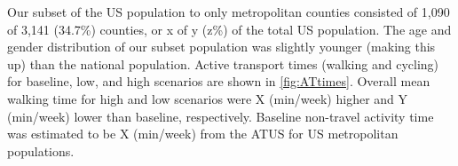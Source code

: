 Our subset of the US population to only metropolitan counties consisted of 1,090 of 3,141 (34.7\%) counties, or x of y (z\%) of the total US population. The age and gender distribution of our subset population was slightly younger (making this up) than the national population. Active transport times (walking and cycling) for baseline, low, and high scenarios are shown in \ref{fig:ATtimes}. Overall mean walking time for high and low scenarios were X (min/week) higher and Y (min/week) lower than baseline, respectively. Baseline non-travel activity time was estimated to be X (min/week) from the ATUS for US metropolitan populations.  



